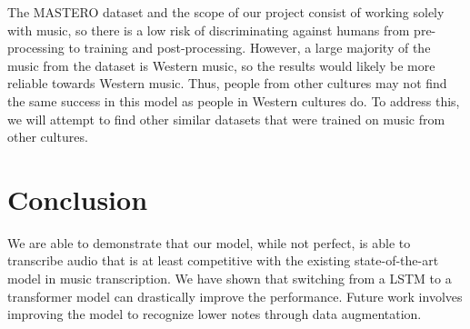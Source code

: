 \documentclass[a4paper,twocolumn,10pt]{article}
\begin{document}
The MASTERO dataset and the scope of our project consist of working solely with music, so there is a low risk of discriminating against humans from pre-processing to training and post-processing. However, a large majority of the music from the dataset is Western music, so the results would likely be more reliable towards Western music. Thus, people from other cultures may not find the same success in this model as people in Western cultures do. To address this, we will attempt to find other similar datasets that were trained on music from other cultures.
\section{Conclusion}
We are able to demonstrate that our model, while not perfect, is able to transcribe audio that is at least competitive with the existing state-of-the-art model in music transcription. We have shown that switching from a LSTM to a transformer model can drastically improve the performance. Future work involves improving the model to recognize lower notes through data augmentation.
\printbibliography
\end{document}
